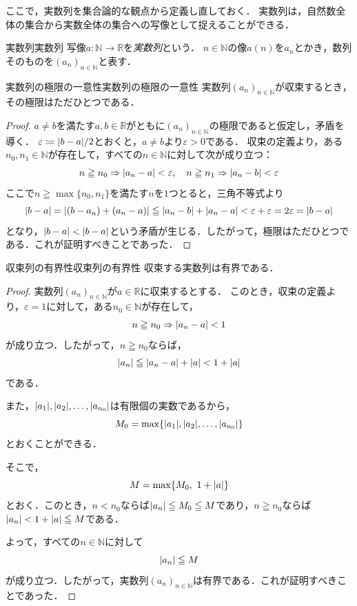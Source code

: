 ここで，実数列を集合論的な観点から定義し直しておく．
実数列は，自然数全体の集合から実数全体の集合への写像として捉えることができる．

\begin{definition}{実数列}{実数列}
  写像$a \colon \mathbb{N} \to \mathbb{R}$を\emph{実数列}という．
  $n \in \mathbb{N}$の像$a(n)$を$a_n$とかき，数列そのものを$(a_n)_{n \in \mathbb{N}}$と表す．
\end{definition}

\begin{prop}{実数列の極限の一意性}{実数列の極限の一意性}
  実数列$(a_n)_{n \in \mathbb{N}}$が収束するとき，その極限はただひとつである．
\end{prop}

\begin{tleftbar}
  \begin{proof}
    $a \ne b$を満たす$a,b \in \mathbb{R}$がともに$(a_n)_{n \in \mathbb{N}}$の極限であると仮定し，矛盾を導く．
    $\varepsilon \coloneqq \abs*{b-a}/2$とおくと，$a \ne b$より$\varepsilon > 0$である．
    収束の定義より，ある$n_0,n_1 \in \mathbb{N}$が存在して，すべての$n \in \mathbb{N}$に対して次が成り立つ：
    \[
      n \geqq n_0 \mathrel{\Rightarrow} \lvert a_n - a\rvert < \varepsilon, \quad n \geqq n_1 \mathrel{\Rightarrow} \lvert a_n - b\rvert < \varepsilon
    \]
    ここで$n \geqq \max\{n_0, n_1\}$を満たす$n$を$1$つとると，三角不等式より
    \[
      \lvert b-a\rvert = \lvert(b - a_n) + (a_n - a)\rvert \leqq \lvert a_n - b\rvert + \lvert a_n - a\rvert < \varepsilon + \varepsilon = 2\varepsilon = \lvert b-a\rvert
    \]
    となり，$\lvert b-a\rvert < \lvert b-a\rvert$という矛盾が生じる．したがって，極限はただひとつである．これが証明すべきことであった．
  \end{proof}
\end{tleftbar}

\begin{prop}{収束列の有界性}{収束列の有界性}
  収束する実数列は有界である．
\end{prop}

\begin{tleftbar}
  \begin{proof}
    実数列$(a_n)_{n \in \mathbb{N}}$が$a \in \mathbb{R}$に収束するとする．
    このとき，収束の定義より，$\varepsilon = 1$に対して，ある$n_0 \in \mathbb{N}$が存在して，
    \[
      n \geqq n_0
      \mathrel{\Rightarrow}
      \lvert a_n-a\rvert<1
    \]
    が成り立つ．したがって，$n \geqq n_0$ならば，
    \[
      \lvert a_n\rvert
      \leqq \lvert a_n-a\rvert+\lvert a\rvert
      < 1+\lvert a\rvert
    \]
    である．

    また，$\lvert a_1\rvert,\lvert a_2\rvert,\ldots,\lvert a_{n_0}\rvert$は有限個の実数であるから，
    \[
      M_0=\max\{\lvert a_1\rvert,\lvert a_2\rvert,\ldots,\lvert a_{n_0}\rvert\}
    \]
    とおくことができる．

    そこで，
    \[
      M=\max\{M_0,\ 1+\abs{a}\}
    \]
    とおく．このとき，$n<n_0$ならば$\lvert a_n\rvert\leqq M_0\leqq M$であり，$n\geqq n_0$ならば$\lvert a_n\rvert<1+\lvert a\rvert\leqq M$である．

    よって，すべての$n\in\mathbb{N}$に対して
    \[
      \lvert a_n\rvert\leqq M
    \]
    が成り立つ．したがって，実数列$(a_n)_{n \in \mathbb{N}}$は有界である．これが証明すべきことであった．
  \end{proof}
\end{tleftbar}

